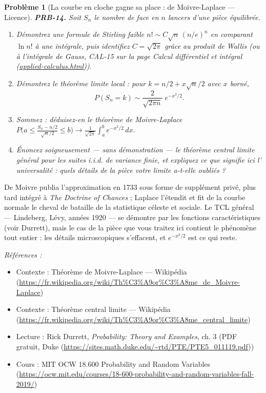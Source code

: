 \documentclass[11pt]{article}
\newtheorem{problem}{Problème}
\newenvironment{refs}{\par\small\noindent\emph{Références :}\begin{itemize}\setlength\itemsep{0pt}}{\end{itemize}\normalsize}
\begin{document}
\bigskip

\begin{problem}[{La courbe en cloche gagne sa place : de Moivre-Laplace --- Licence}]
\textbf{PRB-14.} Soit $ S_n $ le nombre de \og{} face \fg{} en $ n $ lancers
d'une pièce équilibrée.
\begin{enumerate}
\item[(i)] Démontrez une formule de Stirling faible $ n! \sim C\sqrt{n}\,(n/e)^n $ en comparant
$ \ln n! $ à une intégrale, puis identifiez $ C = \sqrt{2\pi} $ grâce au produit de Wallis (ou
à l'intégrale de Gauss, CAL-15 sur la page
Calcul différentiel et intégral (\url{applied-calculus.html})).
\item[(ii)] Démontrez le théorème limite local : pour $ k = n/2 + x\sqrt{n}/2 $ avec $ x $ borné,
\[ P(S_n = k) \sim \frac{2}{\sqrt{2\pi n}}\; e^{-x^2/2} . \]
\item[(iii)] Sommez : déduisez-en le théorème de Moivre-Laplace
$ P\big( a \le \frac{S_n - n/2}{\sqrt{n}/2} \le b \big) \to
\frac{1}{\sqrt{2\pi}}\int_a^b e^{-x^2/2}\,dx $.
\item[(iv)] Énoncez soigneusement --- sans démonstration ---
le théorème central limite général pour les suites i.i.d. de variance finie, et expliquez ce que
signifie ici l'\og{} universalité \fg{} : quels détails de la pièce votre limite a-t-elle oubliés ?
\end{enumerate}

\end{problem}

\noindent De Moivre publia l'approximation en 1733 sous forme de supplément privé, plus
tard intégré à \textit{The Doctrine of Chances} ; Laplace l'étendit et fit de la courbe normale le
cheval de bataille de la statistique céleste et sociale. Le TCL général --- Lindeberg, Lévy, années
1920 --- se démontre par les fonctions caractéristiques (voir Durrett), mais le cas de la pièce que
vous traitez ici contient le phénomène tout entier : les détails microscopiques s'effacent, et
$ e^{-x^2/2} $ est ce qui reste.

\begin{refs}
\item Contexte : Théorème de Moivre-Laplace --- Wikipédia (\url{https://fr.wikipedia.org/wiki/Th%C3%A9or%C3%A8me_de_Moivre-Laplace})
\item Contexte : Théorème central limite --- Wikipédia (\url{https://fr.wikipedia.org/wiki/Th%C3%A9or%C3%A8me_central_limite})
\item Lecture : Rick Durrett, \textit{Probability: Theory and Examples}, ch. 3 (PDF gratuit, Duke (\url{https://sites.math.duke.edu/~rtd/PTE/PTE5_011119.pdf}))
\item Cours : MIT OCW 18.600 Probability and Random Variables (\url{https://ocw.mit.edu/courses/18-600-probability-and-random-variables-fall-2019/})
\end{refs}
\end{document}
